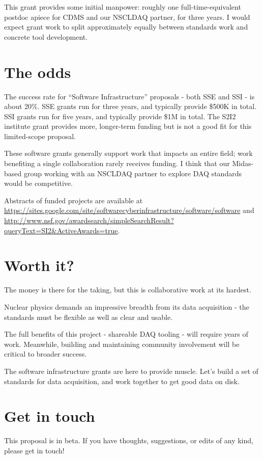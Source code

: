 \documentclass[]{report}   %
\begin{document}
This grant provides some initial manpower: roughly one full-time-equivalent postdoc apiece for CDMS and our NSCLDAQ partner, for three years.  I would expect grant work to split approximately equally between standards work and concrete tool development.



\section*{The odds}     %
The success rate for ``Software Infrastructure'' proposals - both SSE and SSI - is about 20\%. SSE grants run for three years, and typically
provide \$500K in total. SSI grants run for five years, and typically provide \$1M
in total.  The S2I2 institute grant provides more, longer-term funding but is not a good fit for this limited-scope proposal.
 
These software grants generally support work that impacts
an entire field; work benefiting a single collaboration rarely receives
funding. %
I think that our Midas-based group working with an NSCLDAQ partner to explore DAQ standards would be competitive.

Abstracts of funded projects are available at
\url{https://sites.google.com/site/softwarecyberinfrastructure/software/software} and
\url{http://www.nsf.gov/awardsearch/simpleSearchResult?queryText=SI2&ActiveAwards=true}.
 

 
\section*{Worth it?}     %
The money is there for the taking, but this is collaborative work at its hardest.  

Nuclear physics demands an impressive breadth from its data acquisition - the standards must be flexible as well as clear and usable.

The full benefits of this project - shareable DAQ tooling - will require years of work.  Meanwhile, building and maintaining community involvement will be critical to broader success.

The software infrastructure grants are here to provide muscle.  Let's build a set of standards for data acquisition, and work together %
to get good data on disk.

\section*{Get in touch}
This proposal is in beta.  If you have thoughts, suggestions, or edits of any kind, please get in touch!
\end{document}
